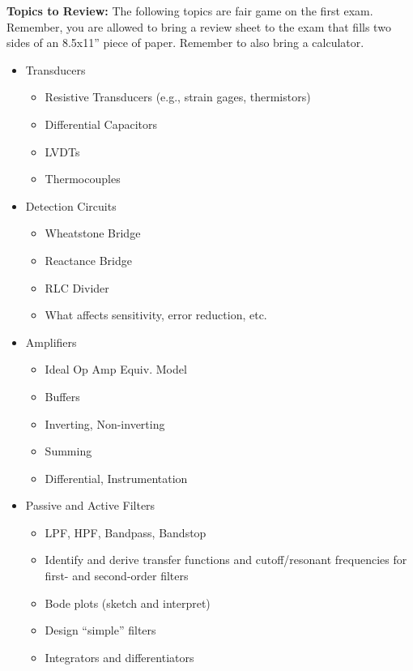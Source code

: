 \documentclass[10pt]{report}
\begin{document}
{\bf Topics to Review:} The following topics are fair game on the first exam.
Remember, you are allowed to bring a review sheet to the exam that fills two
sides of an 8.5x11'' piece of paper.  Remember to also bring a calculator.

\begin{itemize}

\item Transducers
\begin{itemize}
    \item Resistive Transducers (e.g., strain gages, thermistors)
    \item Differential Capacitors
    \item LVDTs
    \item Thermocouples
\end{itemize}

\item Detection Circuits
\begin{itemize}
    \item Wheatstone Bridge
    \item Reactance Bridge
    \item RLC Divider
    \item What affects sensitivity, error reduction, etc.
\end{itemize}

\item Amplifiers
\begin{itemize}
    \item Ideal Op Amp Equiv. Model
    \item Buffers
    \item Inverting, Non-inverting
    \item Summing
    \item Differential, Instrumentation
\end{itemize}

\item Passive and Active Filters
\begin{itemize}
    \item LPF, HPF, Bandpass, Bandstop
    \item Identify and derive transfer functions and cutoff/resonant frequencies for first- and second-order filters
    \item Bode plots (sketch and interpret)
    \item Design ``simple'' filters
    \item Integrators and differentiators
\end{itemize}


\end{itemize}
\end{document}
